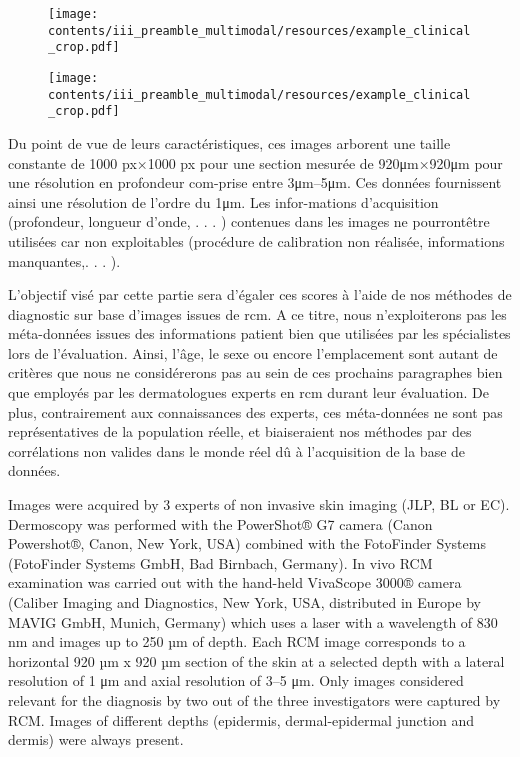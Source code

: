 \begin{figure}[H]
    \begin{center}
        \texttt{[image: contents/iii\_preamble\_multimodal/resources/example\_clinical\_crop.pdf]}
        \caption{}
        \label{fig:example_clinical_crop}
    \end{center} 
\end{figure}\par

\begin{figure}[H]
    \begin{center}
        \texttt{[image: contents/iii\_preamble\_multimodal/resources/example\_clinical\_crop.pdf]}
        \caption{}
        \label{fig:example_clinical_crop}
    \end{center} 
\end{figure}\par

Du point de vue de leurs caractéristiques, ces images arborent une taille constante de 1000 px×1000 px pour une section mesurée de 920μm×920μm pour une résolution en profondeur com-prise entre 3μm–5μm. Ces données fournissent ainsi une résolution de l’ordre du 1μm. Les infor-mations d’acquisition (profondeur, longueur d’onde, . . . )  contenues dans les images ne pourrontêtre utilisées car non exploitables (procédure de calibration non réalisée, informations manquantes,. . . ).

L'objectif visé par cette partie sera d'égaler ces scores à l'aide de nos méthodes de diagnostic sur base d'images issues de \gls{rcm}. A ce titre, nous n'exploiterons pas les méta-données issues des informations patient bien que utilisées par les spécialistes lors de l'évaluation. Ainsi, l'âge, le sexe ou encore l'emplacement sont autant de critères que nous ne considérerons pas au sein de ces prochains paragraphes bien que employés par les dermatologues experts en \gls{rcm} durant leur évaluation. De plus, contrairement aux connaissances des experts, ces méta-données ne sont pas représentatives de la population réelle, et biaiseraient nos méthodes par des corrélations non valides dans le monde réel dû à l'acquisition de la base de données.\par

Images were acquired by 3 experts of non invasive skin imaging (JLP, BL or EC). Dermoscopy was performed with the PowerShot® G7 camera (Canon Powershot®, Canon, New York, USA) combined with the FotoFinder Systems (FotoFinder Systems GmbH, Bad Birnbach, Germany). In vivo RCM examination was carried out with the hand-held VivaScope 3000® camera (Caliber Imaging and Diagnostics, New York, USA, distributed in Europe by MAVIG GmbH, Munich, Germany) which uses a laser with a wavelength of 830 nm and images up to 250 µm of depth. Each RCM image corresponds to a horizontal 920 µm x 920 µm section of the skin at a selected depth with a lateral resolution of 1 μm and axial resolution of 3–5 μm. Only images considered relevant for the diagnosis by two out of the three investigators were captured by RCM. Images of different depths (epidermis, dermal-epidermal junction and dermis) were always present.

